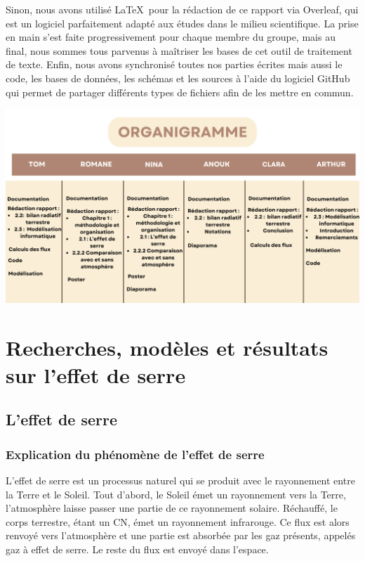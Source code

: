 \documentclass[a4paper, 12pt]{report} %
\begin{document}
Sinon, nous avons utilisé \LaTeX \ pour la rédaction de ce rapport via Overleaf, qui est un logiciel parfaitement adapté aux études dans le milieu scientifique. La prise en main s'est faite progressivement pour chaque membre du groupe, mais au final, nous sommes tous parvenus
à maîtriser les bases de cet outil de traitement de texte.
Enfin, nous avons synchronisé toutes nos parties écrites mais aussi le code, les bases de données, les schémas et les sources à l'aide du logiciel GitHub  qui permet de partager différents types de fichiers afin de les mettre en commun.

\begin{center}
    \includegraphics[scale=0.4]{Images/organigramme p6.png} 
\end{center}



\chapter{Recherches, modèles et résultats sur l'effet de serre}

\section{L'effet de serre}

\subsection{Explication du phénomène de l'effet de serre}

	L'effet de serre est un processus naturel qui se produit 
avec le rayonnement entre la Terre et le Soleil. Tout d'abord, 
le Soleil émet un rayonnement vers la Terre, l'atmosphère 
laisse passer une partie de ce rayonnement solaire. 
Réchauffé, le corps terrestre, étant un CN, émet un rayonnement infrarouge. 
Ce flux est alors renvoyé vers l'atmosphère et une partie est absorbée par les gaz présents, appelés gaz à effet de serre. 
Le reste du flux est envoyé dans l'espace.\vspace{\baselineskip}
\end{document}
